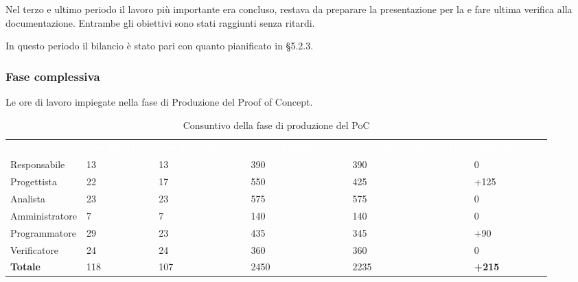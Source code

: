 Nel terzo e ultimo periodo il lavoro più importante era concluso, restava da preparare la presentazione per la \RTB{} e fare ultima verifica alla documentazione. Entrambe gli obiettivi sono stati raggiunti senza ritardi.

In questo periodo il bilancio è stato pari con quanto pianificato in §5.2.3.

\pagebreak 

\subsubsection{Fase complessiva}
Le ore di lavoro impiegate nella fase di Produzione del Proof of Concept.

\begin{table}[H]
\begin{center}
\renewcommand{\arraystretch}{1.5}
\begin{tabular}{ m{}<{\centering}  m{}<{\centering} m{}<{\centering} m{}<{\centering} m{}<{\centering} m{}<{\centering}}	\rowcolor{darkblue}
	\textcolor{white}{\textbf{Ruolo}} & \textcolor{white}{\textbf{Ore Effettive}} & \textcolor{white}{\textbf{Ore Preventivate}}&\textcolor{white}{\textbf{Costo Effettivo (\euro)}}&\textcolor{white}{\textbf{Costo Preventivato (\euro)}}&\textcolor{white}{\textbf{Differenza (\euro)}}\\ 
	Responsabile  & 13 & 13 & 390 & 390 & 0\\	
	
	Progettista & 22 & 17 & 550 & 425 & +125\\
	
	Analista & 23 & 23 & 575 & 575 & 0\\
	
	Amministratore & 7 & 7 & 140 & 140 & 0\\
	
	Programmatore & 29 & 23 & 435 & 345 &  +90\\
	
	Verificatore & 24 & 24 & 360 & 360 & 0\\
	
	\textbf{Totale} & 118 & 107 & 2450 & 2235 & \textbf{+215} \\
	
\end{tabular}
\caption{Consuntivo della fase di produzione del PoC}
\end{center}
\end{table}

